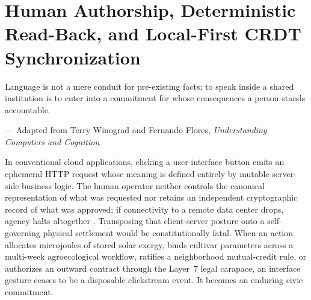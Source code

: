 \chapter{Human Authorship, Deterministic Read-Back, and Local-First CRDT Synchronization}
\label{ch:authorship-crdt}

\epigraph{Language is not a mere conduit for pre-existing facts; to speak inside a shared institution is to enter into a commitment for whose consequences a person stands accountable.}{--- Adapted from Terry Winograd and Fernando Flores, \emph{Understanding Computers and Cognition} \parencite{winograd1986understanding}}

In conventional cloud applications, clicking a user-interface button emits an ephemeral HTTP request whose meaning is defined entirely by mutable server-side business logic. The human operator neither controls the canonical representation of what was requested nor retains an independent cryptographic record of what was approved; if connectivity to a remote data center drops, agency halts altogether \parencite{kleppmann2019localfirst}. Transposing that client-server posture onto a self-governing physical settlement would be constitutionally fatal. When an action allocates microjoules of stored solar exergy, binds cultivar parameters across a multi-week agroecological workflow, ratifies a neighborhood mutual-credit rule, or authorizes an outward contract through the Layer~7 legal carapace, an interface gesture ceases to be a disposable clickstream event. It becomes an enduring civic commitment.

